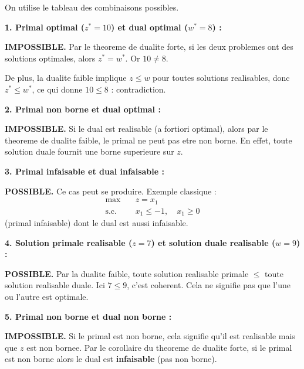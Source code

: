 \documentclass[12pt,a4paper]{article}
\begin{document}
\begin{correction}
On utilise le tableau des combinaisons possibles.

\textbf{1. Primal optimal ($z^* = 10$) et dual optimal ($w^* = 8$) :}

\textcolor{importantrouge}{\textbf{IMPOSSIBLE.}} Par le theoreme de dualite forte, si les deux problemes ont des solutions optimales, alors $z^* = w^*$. Or $10 \neq 8$. 

De plus, la dualite faible implique $z \leq w$ pour toutes solutions realisables, donc $z^* \leq w^*$, ce qui donne $10 \leq 8$ : contradiction.

\vspace{0.5em}
\textbf{2. Primal non borne et dual optimal :}

\textcolor{importantrouge}{\textbf{IMPOSSIBLE.}} Si le dual est realisable (a fortiori optimal), alors par le theoreme de dualite faible, le primal ne peut pas etre non borne. En effet, toute solution duale fournit une borne superieure sur $z$. 

\vspace{0.5em}
\textbf{3. Primal infaisable et dual infaisable :}

\textcolor{defvert}{\textbf{POSSIBLE.}} Ce cas peut se produire. Exemple classique :
\begin{align*}
\text{max} \quad & z = x_1\\
\text{s.c.} \quad & x_1 \leq -1, \quad x_1 \geq 0
\end{align*}
(primal infaisable) dont le dual est aussi infaisable. 

\vspace{0.5em}
\textbf{4. Solution primale realisable ($z = 7$) et solution duale realisable ($w = 9$) :}

\textcolor{defvert}{\textbf{POSSIBLE.}} Par la dualite faible, toute solution realisable primale $\leq$ toute solution realisable duale. Ici $7 \leq 9$, c'est coherent. Cela ne signifie pas que l'une ou l'autre est optimale. 

\vspace{0.5em}
\textbf{5. Primal non borne et dual non borne :}

\textcolor{importantrouge}{\textbf{IMPOSSIBLE.}} Si le primal est non borne, cela signifie qu'il est realisable mais que $z$ est non bornee. Par le corollaire du theoreme de dualite forte, si le primal est non borne alors le dual est \textbf{infaisable} (pas non borne). 
\end{correction}
\end{document}
